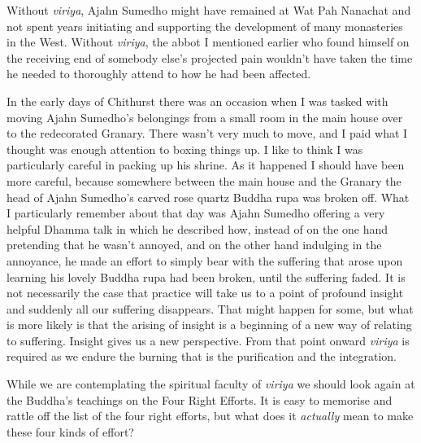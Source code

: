 Without \emph{viriya}, Ajahn Sumedho might have remained at Wat Pah
Nanachat and not spent years initiating and supporting the development
of many monasteries in the West. Without \emph{viriya}, the abbot I
mentioned earlier who found himself on the receiving end of somebody
else's projected pain wouldn't have taken the time he needed to
thoroughly attend to how he had been affected.

In the early days of Chithurst there was an occasion when I was tasked
with moving Ajahn Sumedho's belongings from a small room in the main
house over to the redecorated Granary. There wasn't very much to move,
and I paid what I thought was enough attention to boxing things up. I
like to think I was particularly careful in packing up his shrine. As it
happened I should have been more careful, because somewhere between the
main house and the Granary the head of Ajahn Sumedho's carved rose
quartz Buddha rupa was broken off. What I particularly remember about
that day was Ajahn Sumedho offering a very helpful Dhamma talk in which
he described how, instead of on the one hand pretending that he wasn't
annoyed, and on the other hand indulging in the annoyance, he made an
effort to simply bear with the suffering that arose upon learning his
lovely Buddha rupa had been broken, until the suffering faded. It is not
necessarily the case that practice will take us to a point of profound
insight and suddenly all our suffering disappears. That might happen for
some, but what is more likely is that the arising of insight is a
beginning of a new way of relating to suffering. Insight gives us a new
perspective. From that point onward \emph{viriya} is required as we
endure the burning that is the purification and the integration.

While we are contemplating the spiritual faculty of \emph{viriya} we
should look again at the Buddha's teachings on the Four Right Efforts.
It is easy to memorise and rattle off the list of the four right
efforts, but what does it \emph{actually} mean to make these four kinds
of effort?


